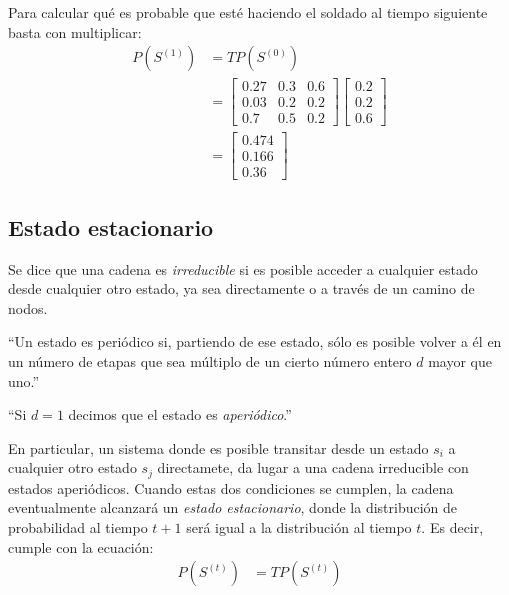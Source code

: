 Para calcular qué es probable que esté haciendo el soldado al tiempo siguiente basta con multiplicar:
\begin{align*}
 P(S^{(1)}) &= T P(S^{(0)}) \\
   &= \begin{bmatrix}
        0.27 & 0.3 & 0.6 \\
        0.03 & 0.2 & 0.2 \\
        0.7  & 0.5 & 0.2
       \end{bmatrix}
       \begin{bmatrix}
	    0.2 \\
	    0.2 \\
	    0.6
	 \end{bmatrix} \\
   &=  \begin{bmatrix}
        0.474 \\
        0.166 \\
        0.36
       \end{bmatrix}
\end{align*}

\subsection{Estado estacionario}

\begin{definition}
 Se dice que una cadena es \emph{irreducible} si es posible acceder a cualquier estado desde cualquier otro estado, ya sea directamente o a través de un camino de nodos.
\end{definition}

\begin{definition}
 ``Un estado es periódico si, partiendo de ese estado, sólo es posible volver a él en un número de etapas que sea múltiplo de un cierto número entero $d$ mayor que uno.''

 ``Si $d = 1$ decimos que el estado es \emph{aperiódico}.''
 \parencite{gestiondeoperaciones2013}
\end{definition}

En particular, un sistema donde es posible transitar desde un estado $s_i$ a cualquier otro estado $s_j$ directamete, da lugar a una cadena irreducible con estados aperiódicos.  Cuando estas dos condiciones se cumplen, la cadena eventualmente alcanzará un \emph{estado estacionario}, donde la distribución de probabilidad al tiempo $t+1$ será igual a la distribución al tiempo $t$.  Es decir, cumple con la ecuación:
\begin{align*}
 P(S^{(t)}) &= T P(S^{(t)})
\end{align*}

